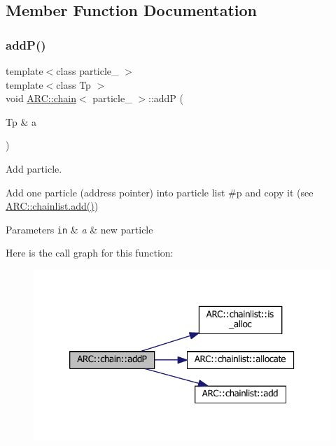\subsection{Member Function Documentation}
\hypertarget{classARC_1_1chain_a2df655cb46fcb7e892f196340e7d5c83}{}\label{classARC_1_1chain_a2df655cb46fcb7e892f196340e7d5c83} 
\subsubsection{\texorpdfstring{add\+P()}{addP()}\hspace{0.1cm}{\footnotesize\ttfamily [1/2]}}
{\footnotesize\ttfamily template$<$class particle\+\_\+ $>$ \\
template$<$class Tp $>$ \\
void \hyperlink{classARC_1_1chain}{A\+R\+C\+::chain}$<$ particle\+\_\+ $>$\+::addP (\begin{DoxyParamCaption}\item[{Tp \&}]{a }\end{DoxyParamCaption})\hspace{0.3cm}{\ttfamily [inline]}}



Add particle. 

Add one particle (address pointer) into particle list \#p and copy it (see \hyperlink{classARC_1_1chainlist_a598c1819d8e715ec0a24669e5bb06c6a}{A\+R\+C\+::chainlist.\+add()}) 
\begin{DoxyParams}[1]{Parameters}
\mbox{\tt in}  & {\em a} & new particle \\
\hline
\end{DoxyParams}
Here is the call graph for this function\+:
\nopagebreak
\begin{figure}[H]
\begin{center}
\leavevmode
\includegraphics[width=326pt]{classARC_1_1chain_a2df655cb46fcb7e892f196340e7d5c83_cgraph}
\end{center}
\end{figure}
\hypertarget{classARC_1_1chain_afe416c7e33c99c4e9cdd1391bae332ec}{}\label{classARC_1_1chain_afe416c7e33c99c4e9cdd1391bae332ec} 
